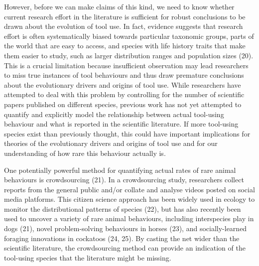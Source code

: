\documentclass[
  man,floatsintext]{apa6}
\begin{document}
However, before we can make claims of this kind, we need to know whether current
research effort in the literature is sufficient for robust conclusions to be
drawn about the evolution of tool use. In fact, evidence suggests that research
effort is often systematically biased towards particular taxonomic groups, parts
of the world that are easy to access, and species with life history traits that
make them easier to study, such as larger distribution ranges and population
sizes (20). This is a crucial limitation because insufficient
observation may lead researchers to miss true instances of tool behaviours and
thus draw premature conclusions about the evolutionary drivers and origins of
tool use. While researchers have attempted to deal with this problem by
controlling for the number of scientific papers published on different species,
previous work has not yet attempted to quantify and explicitly model the
relationship between actual tool-using behaviour and what is reported in the
scientific literature. If more tool-using species exist than previously thought,
this could have important implications for theories of the evolutionary drivers
and origins of tool use and for our understanding of how rare this behaviour
actually is.

One potentially powerful method for quantifying actual rates of rare animal
behaviours is crowdsourcing (21). In a crowdsourcing study, researchers
collect reports from the general public and/or collate and analyse videos posted
on social media platforms. This citizen science approach has been widely used in
ecology to monitor the distributional patterns of species (22), but
has also recently been used to uncover a variety of rare animal behaviours,
including interspecies play in dogs (21), novel problem-solving
behaviours in horses (23), and socially-learned foraging innovations
in cockatoos (24, 25). By casting the net wider than the
scientific literature, the crowdsourcing method can provide an indication of the
tool-using species that the literature might be missing.
\end{document}

